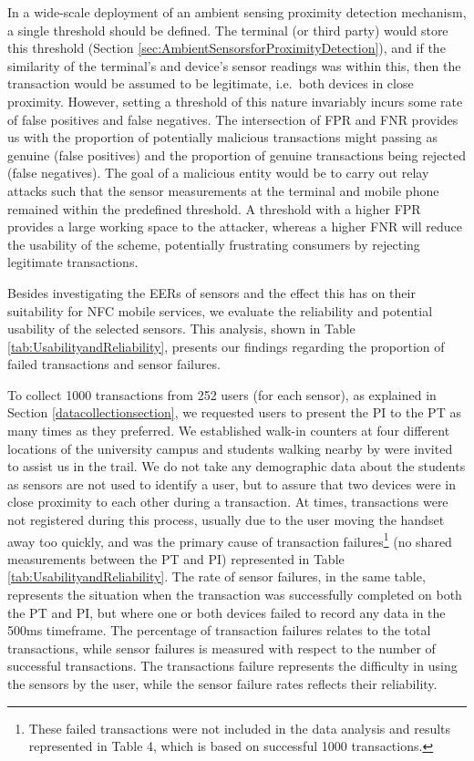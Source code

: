 \documentclass{article}
\begin{document}
In a wide-scale deployment of an ambient sensing proximity detection mechanism, a single threshold should be defined. The terminal (or third party) would store this threshold (Section \ref{sec:AmbientSensorsforProximityDetection}), and if the similarity of the terminal's and device's sensor readings was within this, then the transaction would be assumed to be legitimate, i.e.\ both devices in close proximity. However, setting a threshold of this nature invariably incurs some rate of false positives and false negatives.  The intersection of FPR and FNR provides us with the proportion of potentially malicious transactions might passing as genuine (false positives) and the proportion of genuine transactions being rejected (false negatives). The goal of a malicious entity would be to carry out relay attacks such that the sensor measurements at the terminal and mobile phone remained within the predefined threshold.  A threshold with a higher FPR provides a large working space to the attacker, whereas a higher FNR will reduce the usability of the scheme, potentially frustrating consumers by rejecting legitimate transactions. 



Besides investigating the EERs of sensors and the effect this has on their suitability for NFC mobile services, we evaluate the reliability and potential usability of the selected sensors.   This analysis, shown in Table \ref{tab:UsabilityandReliability}, presents our findings regarding the proportion of failed transactions and sensor failures.


To collect 1000 transactions from 252 users (for each sensor), as explained in Section \ref{datacollectionsection}, we requested users to present the PI to the PT as many times as they preferred.  We established walk-in counters at four different locations of the university campus and students walking nearby by were invited to assist us in the trail.  We do not take any demographic data about the students as sensors are not used to identify a user, but to assure that two devices were in close proximity to each other during a transaction.  At times, transactions were not registered during this process, usually due to the user moving the handset away too quickly, and was the primary cause of transaction failures\footnote{These failed transactions were not included in the data analysis and results represented in Table 4, which is based on successful 1000 transactions.} (no shared measurements between the PT and PI) represented in Table \ref{tab:UsabilityandReliability}. The rate of sensor failures, in the same table, represents the situation when the transaction was successfully completed on both the PT and PI, but where one or both devices failed to record any data in the 500ms timeframe.  The percentage of transaction failures relates to the total transactions, while sensor failures is measured with respect to the number of successful transactions.  The transactions failure represents the difficulty in using the sensors by the user, while the sensor failure rates reflects their reliability.
\end{document}
